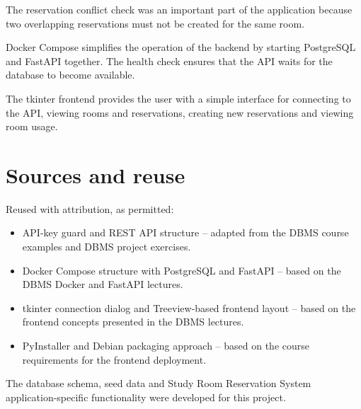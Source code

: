 \documentclass[10pt,a4paper]{article}
\begin{document}
	The reservation conflict check was an important part of the
	application because two overlapping reservations must not be
	created for the same room.
	
	Docker Compose simplifies the operation of the backend by starting
	PostgreSQL and FastAPI together. The health check ensures that the
	API waits for the database to become available.
	
	The tkinter frontend provides the user with a simple interface for
	connecting to the API, viewing rooms and reservations, creating new
	reservations and viewing room usage.
	
	
	
	\section*{Sources and reuse}
	
	Reused with attribution, as permitted:
	
	\begin{itemize}[leftmargin=6mm,itemsep=3pt]
		
		\item
		API-key guard and REST API structure -- adapted from the
		DBMS course examples and DBMS project exercises.
		
		\item
		Docker Compose structure with PostgreSQL and FastAPI -- based
		on the DBMS Docker and FastAPI lectures.
		
		\item
		tkinter connection dialog and Treeview-based frontend layout --
		based on the frontend concepts presented in the DBMS lectures.
		
		\item
		PyInstaller and Debian packaging approach -- based on the
		course requirements for the frontend deployment.
		
	\end{itemize}
	
	The database schema, seed data and Study Room Reservation System
	application-specific functionality were developed for this project.
	
\end{document}

